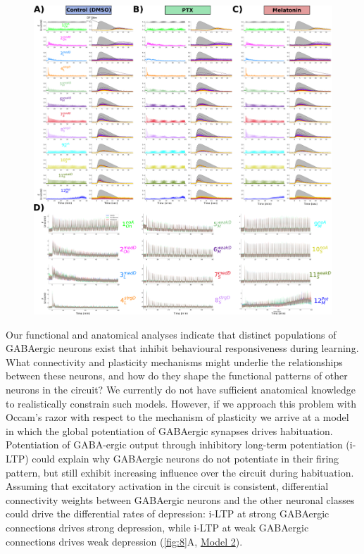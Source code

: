 \documentclass[9pt,lineno]{RandlettLab_elife}
\begin{document}
\begin{figure}
\begin{fullwidth}
\begin{center}
{}{\includegraphics[width=14cm]{FigureS3_DrugsMeanVectors.png}}
\label{fig:S8}
\end{center}
\end{fullwidth}
\end{figure}


Our functional and anatomical analyses indicate that distinct populations of GABAergic neurons exist that inhibit behavioural responsiveness during learning. What connectivity and plasticity mechanisms might underlie the relationships between these neurons, and how do they shape the functional patterns of other neurons in the circuit? We currently do not have sufficient anatomical knowledge to realistically constrain such models. However, if we approach this problem with Occam's razor with respect to the mechanism of plasticity we arrive at a model in which the global potentiation of GABAergic synapses drives habituation. Potentiation of GABA-ergic output through inhibitory long-term potentiation (i-LTP) could explain why GABAergic neurons do not potentiate in their firing pattern, but still exhibit increasing influence over the circuit during habituation. Assuming that excitatory activation in the circuit is consistent, differential connectivity weights between GABAergic neurons and the other neuronal classes could drive the differential rates of depression: i-LTP at strong GABAergic connections drives strong depression, while i-LTP at weak GABAergic connections drives weak depression (\autoref{fig:8}A, \underline{Model 2}). 
\end{document}
